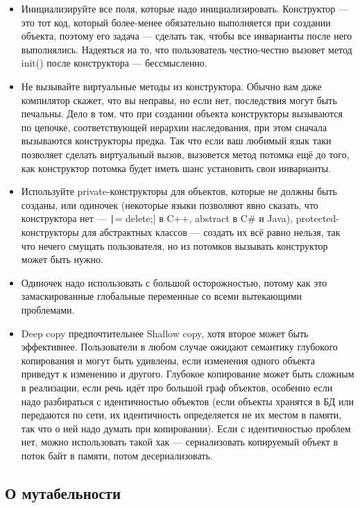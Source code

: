 \documentclass{../text-style}
\begin{document}
\begin{itemize}
    \item Инициализируйте все поля, которые надо инициализировать. Конструктор --- это тот код, который более-менее обязательно выполняется при создании объекта, поэтому его задача --- сделать так, чтобы все инварианты после него выполнялись. Надеяться на то, что пользователь честно-честно вызовет метод init() после конструктора --- бессмысленно.
    \item Не вызывайте виртуальные методы из конструктора. Обычно вам даже компилятор скажет, что вы неправы, но если нет, последствия могут быть печальны. Дело в том, что при создании объекта конструкторы вызываются по цепочке, соответствующей иерархии наследования, при этом сначала вызываются конструкторы предка. Так что если ваш любимый язык таки позволяет сделать виртуальный вызов, вызовется метод потомка ещё до того, как конструктор потомка будет иметь шанс установить свои инварианты.
    \item Используйте private-конструкторы для объектов, которые не должны быть созданы, или одиночек (некоторые языки позволяют явно сказать, что конструктора нет --- \texttt|= delete;| в C++, abstract в C\# и Java), protected-конструкторы для абстрактных классов --- создать их всё равно нельзя, так что нечего смущать пользователя, но из потомков вызывать конструктор может быть нужно.
    \item Одиночек надо использовать с большой осторожностью, потому как это замаскированные глобальные переменные со всеми вытекающими проблемами.
    \item Deep copy предпочтительнее Shallow copy, хотя второе может быть эффективнее. Пользователи в любом случае ожидают семантику глубокого копирования и могут быть удивлены, если изменения одного объекта приведут к изменению и другого. Глубокое копирование может быть сложным в реализации, если речь идёт про большой граф объектов, особенно если надо разбираться с идентичностью объектов (если объекты хранятся в БД или передаются по сети, их идентичность определяется не их местом в памяти, так что о ней надо думать при копировании). Если с идентичностью проблем нет, можно использовать такой хак --- сериализовать копируемый объект в поток байт в памяти, потом десериализовать.
\end{itemize}

\subsection{О мутабельности}
\end{document}
